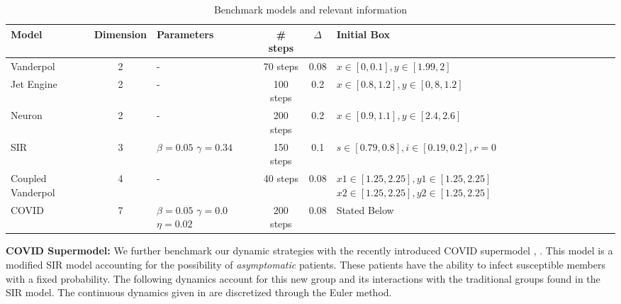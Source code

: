 \vspace{-1em}
\begin{table}[h!]
  \centering
\begin{tabular}{|p{1.5cm}|c|p{1.5cm}|c|c|p{5cm}|}
\hline
Model & Dimension & Parameters & \# steps & $\Delta$ & \hspace{1.5cm}Initial Box \\
\hline
Vanderpol & 2 & - & 70 steps & 0.08 & $x \in [0,0.1], y \in [1.99,2]$ \\
\hline
Jet Engine& 2 & - & 100 steps & 0.2 & $x \in [0.8,1.2], y \in [0,8,1.2]$ \\
\hline
Neuron \cite{fitzhugh1961impulses}& 2 & - & 200 steps & 0.2 & $x \in [0.9,1.1], y \in [2.4,2.6]$ \\
\hline
SIR& 3 & $\beta=0.05$ \newline $\gamma=0.34$ & 150 steps & 0.1 & $s \in [0.79,0.8], i \in [0.19,0.2], r = 0$ \\
\hline
Coupled \newline Vanderpol & 4 & - & 40 steps & 0.08 & $x1 \in [1.25, 2.25], y1 \in [1.25, 2.25]$ \newline $x2 \in [1.25, 2.25], y2 \in [1.25, 2.25]$ \\
\hline
COVID & 7 & $\beta=0.05$ \newline $\gamma=0.0$ \newline $\eta=0.02$ & 200 steps & 0.08 & Stated Below\\
\hline
\end{tabular}
\caption{Benchmark models and relevant information}
\label{tab:modeldyns}
\end{table}

\vspace{-2em}
\noindent \textbf{COVID Supermodel:}
%
We further benchmark our dynamic strategies with the recently introduced COVID supermodel \cite{ansumali2020modelling}, \cite{indiansuper2020supermodel}. This model is a modified SIR model accounting for the possibility of \emph{asymptomatic} patients. These patients have the ability to infect susceptible members with a fixed probability. The following dynamics account for this new group and its interactions with the traditional groups found in the SIR model. The continuous dynamics given in \cite{indiansuper2020supermodel} are discretized through the Euler method.

